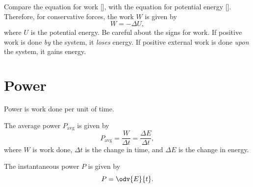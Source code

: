 Compare the equation for work [],
with the equation for potential energy [].
Therefore, for conservative forces, the work \(W\) is given by
\begin{equation}
    W = - \Delta{U},
\end{equation}
where \(U\) is the potential energy.
Be careful about the signs for work.
If positive work is done \emph{by} the system, it \emph{loses} energy.
If positive external work is done \emph{upon} the system, it gains energy.

\section{Power}

Power is work done per unit of time.

The average power \(P_\mathrm{avg}\) is given by
\begin{equation}
    P_\mathrm{avg} = \frac{W}{\Delta{t}} = \frac{\Delta{E}}{\Delta{t}},
\end{equation}
where \(W\) is work done, \(\Delta{t}\) is the change in time,
and \(\Delta{E}\) is the change in energy.

The instantaneous power \(P\) is given by
\begin{equation}
    P = \odv{E}{t}.
\end{equation}
